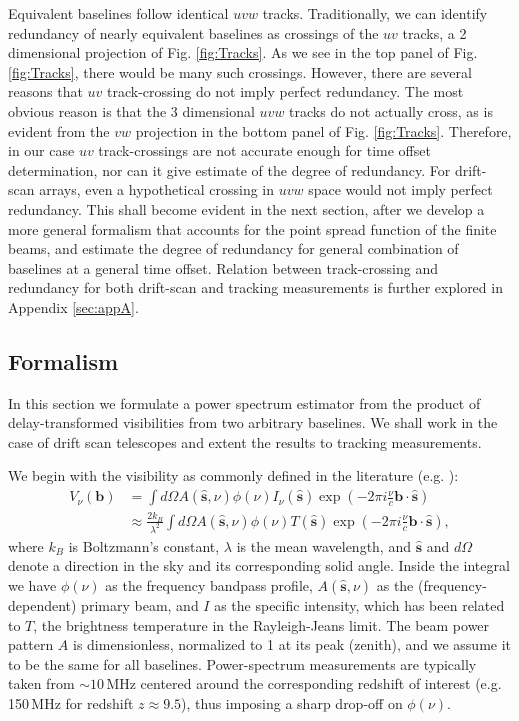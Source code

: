 \documentclass[twocolumn,apj,numberedappendix]{emulateapj}
\renewcommand\[{\begin{equation}}
\renewcommand\]{\end{equation}}
\begin{document}
Equivalent baselines follow identical $uvw$ tracks. Traditionally, we can identify
redundancy of nearly equivalent baselines as crossings
of the $uv$ tracks, a 2 dimensional projection of Fig. \ref{fig:Tracks}. As we see in the top panel of Fig. \ref{fig:Tracks}, there would be many such crossings. However, there are several reasons that $uv$ track-crossing do not imply perfect redundancy. The most obvious reason is that the 3 dimensional $uvw$ tracks do not actually cross, as is evident from the $vw$ projection in the bottom panel of Fig. \ref{fig:Tracks}. Therefore, in our case $uv$ track-crossings are
not accurate enough for time offset determination, nor can it give estimate of the degree of redundancy.   For drift-scan arrays, even a hypothetical crossing in $uvw$ space would not imply perfect redundancy. This shall become evident in the next section, after we develop a more general formalism that accounts for the point spread function of the finite beams, and estimate the degree of redundancy for general combination of baselines at a general time offset. Relation between track-crossing and redundancy for both drift-scan and tracking measurements is further explored in Appendix \ref{sec:appA}. 



\subsection{Formalism \label{sec:formalism}}
\label{sec:formalism}
In this section we formulate a power spectrum estimator from
the product of delay-transformed visibilities from two arbitrary baselines. We shall work in the case of drift scan telescopes and extent the results to tracking measurements. 

We begin with the visibility as commonly defined in the literature (e.g.
\citealt{TMS, first-paper}): 
\begin{equation}
\begin{aligned}V_{\nu}(\boldsymbol{b}) & =\int d\Omega A(\hat{\boldsymbol{s}},\nu)\phi(\nu)I_{\nu}(\hat{\boldsymbol{s}})\exp\left(-2\pi i\frac{\nu}{c}\boldsymbol{b}\cdot\hat{\boldsymbol{s}}\right)\\
 & \approx\frac{2k_{B}}{\lambda^{2}}\int d\Omega A(\hat{\boldsymbol{s}},\nu)\phi(\nu)T(\hat{\boldsymbol{s}})\exp\left(-2\pi i\frac{\nu}{c}\boldsymbol{b}\cdot\hat{\boldsymbol{s}}\right),
\end{aligned}
\label{eq:Vis1}
\end{equation}
where $k_B$ is Boltzmann's constant, $\lambda$ is the mean wavelength, and $\hat{\boldsymbol{s}}$ and $d \Omega$ denote a direction in the
sky and its corresponding solid angle. Inside the integral we have $\phi(\nu)$ as the frequency bandpass profile, $A(\hat{\boldsymbol{s}},\nu)$ as the (frequency-dependent) primary beam, and $I$ as the specific intensity, which has been
related to $T$, the brightness temperature in the Rayleigh-Jeans
limit. The beam power pattern $A$ is dimensionless,
normalized to 1 at its peak (zenith), and we assume it to be the same
for all baselines. Power-spectrum measurements are typically taken from $\sim10$\,MHz centered around the corresponding redshift of interest (e.g. 150\,MHz for redshift $z\approx9.5$), thus imposing a sharp drop-off on $\phi(\nu)$. 
\end{document}
